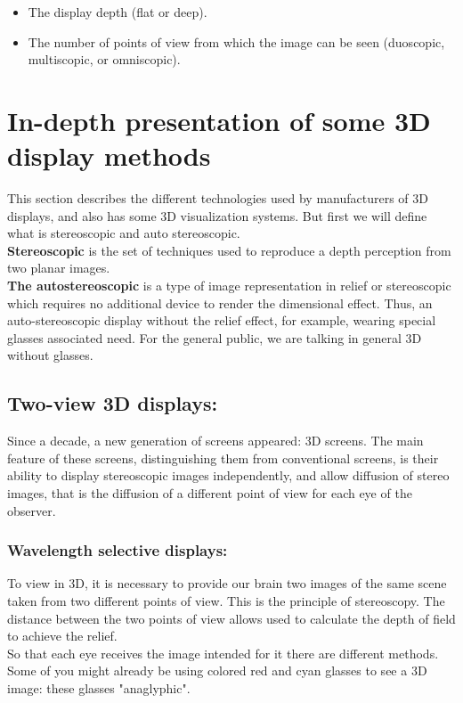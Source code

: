 \begin{itemize}
\item The display depth (flat or deep).
\item The number of points of view from which the image can be seen (duoscopic, multiscopic, or omniscopic).
\end{itemize}

\section{In-depth presentation of some 3D display methods}
This section describes the different technologies used by manufacturers of 3D displays, and also has some 3D visualization systems. But first we will define what is stereoscopic and auto stereoscopic.\\
\textbf{Stereoscopic} is the set of techniques used to reproduce a depth perception from two planar images.\\
\textbf{The autostereoscopic} is a type of image representation in relief or stereoscopic which requires no additional device to render the dimensional effect. Thus, an auto-stereoscopic display without the relief effect, for example, wearing special glasses associated need. For the general public, we are talking in general 3D without glasses.

\subsection{Two-view 3D displays:}
Since a decade, a new generation of screens appeared: 3D screens. The main feature of these screens, distinguishing them from conventional screens, is their ability to display stereoscopic images independently, and allow diffusion of stereo images, that is the diffusion of a different point of view for each eye of the observer.
\subsubsection{Wavelength selective displays:}
To view in 3D, it is necessary to provide our brain two images of the same scene taken from two different points of view. This is the principle of stereoscopy. The distance between the two points of view allows used to calculate the depth of field to achieve the relief.\\
So that each eye receives the image intended for it there are different methods. Some of you might already be using colored red and cyan glasses to see a 3D image: these glasses "anaglyphic".

